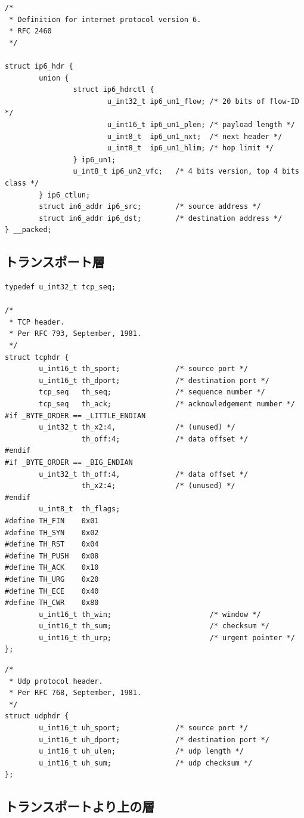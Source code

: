 \begin{lstlisting}[caption=IPv6ヘッダ定義 (/usr/include/netinet/ip6.h),label=src:ip6.h]
/*
 * Definition for internet protocol version 6.
 * RFC 2460
 */

struct ip6_hdr {
        union {
                struct ip6_hdrctl {
                        u_int32_t ip6_un1_flow; /* 20 bits of flow-ID */
                        u_int16_t ip6_un1_plen; /* payload length */
                        u_int8_t  ip6_un1_nxt;  /* next header */
                        u_int8_t  ip6_un1_hlim; /* hop limit */
                } ip6_un1;
                u_int8_t ip6_un2_vfc;   /* 4 bits version, top 4 bits class */
        } ip6_ctlun;
        struct in6_addr ip6_src;        /* source address */
        struct in6_addr ip6_dst;        /* destination address */
} __packed;
\end{lstlisting}

\subsection{トランスポート層} \label{sec:transport}

\begin{lstlisting}[caption=TCPヘッダ定義 (/usr/include/netinet/tcp.h),label=src:tcp.h]
typedef u_int32_t tcp_seq;

/*
 * TCP header.
 * Per RFC 793, September, 1981.
 */
struct tcphdr {
        u_int16_t th_sport;             /* source port */
        u_int16_t th_dport;             /* destination port */
        tcp_seq   th_seq;               /* sequence number */
        tcp_seq   th_ack;               /* acknowledgement number */
#if _BYTE_ORDER == _LITTLE_ENDIAN
        u_int32_t th_x2:4,              /* (unused) */
                  th_off:4;             /* data offset */
#endif
#if _BYTE_ORDER == _BIG_ENDIAN
        u_int32_t th_off:4,             /* data offset */
                  th_x2:4;              /* (unused) */
#endif
        u_int8_t  th_flags;
#define TH_FIN    0x01
#define TH_SYN    0x02
#define TH_RST    0x04
#define TH_PUSH   0x08
#define TH_ACK    0x10
#define TH_URG    0x20
#define TH_ECE    0x40
#define TH_CWR    0x80
        u_int16_t th_win;                       /* window */
        u_int16_t th_sum;                       /* checksum */
        u_int16_t th_urp;                       /* urgent pointer */
};
\end{lstlisting}

\begin{lstlisting}[caption=UDPヘッダ定義 (/usr/include/netinet/udp.h),label=src:udp.h]
/*
 * Udp protocol header.
 * Per RFC 768, September, 1981.
 */
struct udphdr {
        u_int16_t uh_sport;             /* source port */
        u_int16_t uh_dport;             /* destination port */
        u_int16_t uh_ulen;              /* udp length */
        u_int16_t uh_sum;               /* udp checksum */
};
\end{lstlisting}

\subsection{トランスポートより上の層}